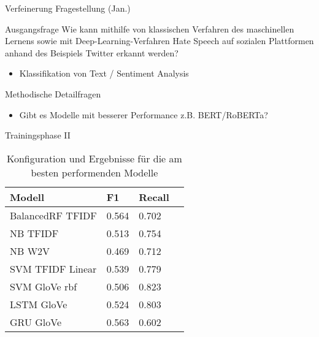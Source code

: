 \documentclass[aspectratio=169]{beamer} %
\begin{document}
\begin{frame}{Verfeinerung Fragestellung (Jan.)}
    \begin{block}{Ausgangsfrage}
        Wie kann mithilfe von klassischen Verfahren des maschinellen Lernens sowie mit Deep-Learning-Verfahren Hate Speech auf sozialen Plattformen anhand des Beispiels Twitter erkannt werden?
        \begin{itemize}
            \item Klassifikation von Text / Sentiment Analysis
        \end{itemize}
    \end{block}    
    \begin{exampleblock}{Methodische Detailfragen}
        \begin{itemize}
            \item Gibt es Modelle mit besserer Performance z.B. BERT/RoBERTa?
        \end{itemize}
    \end{exampleblock}
\end{frame}


\begin{frame}{Trainingsphase II}

\begin{table}[h]
	\begin{tabular}{|p{5.5cm}|p{2cm}|p{2cm}|p{2cm}|}
		\hline
			\textbf{Modell} & \textbf{F1} & \textbf{Recall} \\
		\hline 
                BalancedRF TFIDF	&  0.564 & 0.702  \\
			NB TFIDF	& 0.513	& 0.754	 \\
			NB W2V	& 0.469	& 0.712 \\
                SVM TFIDF Linear & 0.539 & 0.779 \\
                SVM GloVe rbf & 0.506 & 0.823 \\
			LSTM GloVe	& 0.524 & 0.803  \\
			GRU GloVe	& 0.563 & 0.602   \\
                
		\hline
\end{tabular}
\caption{Konfiguration und Ergebnisse für die am besten performenden Modelle}
\label{tab:model_performance}
\end{table}

\end{frame}
\end{document}
